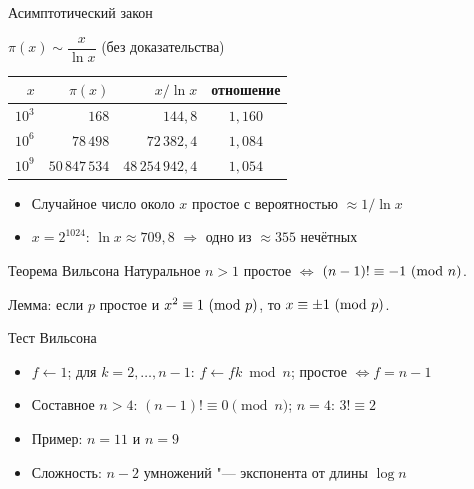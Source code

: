 \documentclass{ca-slides}
\begin{document}
\begin{canvasframe}{Асимптотический закон}
  \small
  \begin{theorem}
    $\pi(x) \sim \dfrac{x}{\ln x}$ \quad (без доказательства)
  \end{theorem}
  \begin{center}
  \begin{tabular}{r|r|r|c}
    $x$ & $\pi(x)$ & $x / \ln x$ & отношение \\ \hline
    $10^3$ & $168$ & $144{,}8$ & $1{,}160$ \\
    $10^6$ & $78\,498$ & $72\,382{,}4$ & $1{,}084$ \\
    $10^9$ & $50\,847\,534$ & $48\,254\,942{,}4$ & $1{,}054$
  \end{tabular}
  \end{center}
  \begin{itemize}
    \item Случайное число около $x$ простое с вероятностью $\approx 1/\ln x$
    \item $x = 2^{1024}$: $\ln x \approx 709{,}8$ $\Rightarrow$ одно из $\approx 355$ нечётных
  \end{itemize}
\end{canvasframe}

\begin{theoremframe}{Теорема Вильсона}
  Натуральное $n > 1$ простое $\iff$ $(n - 1)! \equiv -1\ (\mathrm{mod}\ n)$.

  \smallskip Лемма: если $p$ простое и $x^2 \equiv 1\ (\mathrm{mod}\ p)$, то $x \equiv \pm 1\ (\mathrm{mod}\ p)$.
\end{theoremframe}

\begin{canvasframe}{Тест Вильсона}
  \begin{itemize}
    \item $f \gets 1$; для $k = 2, \ldots, n - 1$: $f \gets f k \bmod n$; простое $\iff f = n - 1$
    \item Составное $n > 4$: $(n - 1)! \equiv 0 \pmod n$; \quad $n = 4$: $3! \equiv 2$
    \item Пример: $n = 11$ и $n = 9$
  \end{itemize}
  \penspace[0.3\textheight]
  \begin{itemize}
    \item Сложность: $n - 2$ умножений "--- \alert{экспонента} от длины $\log n$
  \end{itemize}
\end{canvasframe}
\end{document}

